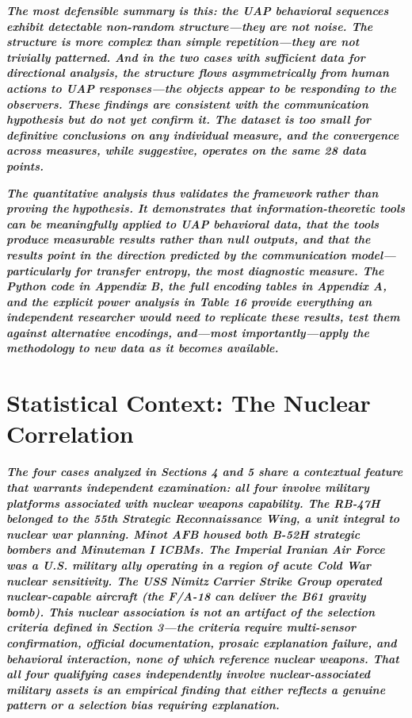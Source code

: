 \documentclass[11pt,letterpaper]{article}
\begin{document}
\textbf{\textit{The most defensible summary is this: the UAP behavioral sequences exhibit detectable non-random structure---they are not noise. The structure is more complex than simple repetition---they are not trivially patterned. And in the two cases with sufficient data for directional analysis, the structure flows asymmetrically from human actions to UAP responses---the objects appear to be responding to the observers. These findings are consistent with the communication hypothesis but do not yet confirm it. The dataset is too small for definitive conclusions on any individual measure, and the convergence across measures, while suggestive, operates on the same 28 data points.}}


\textbf{\textit{The quantitative analysis thus validates the }}\textbf{\textit{framework}}\textbf{\textit{ rather than proving the }}\textbf{\textit{hypothesis}}\textbf{\textit{. It demonstrates that information-theoretic tools can be meaningfully applied to UAP behavioral data, that the tools produce measurable results rather than null outputs, and that the results point in the direction predicted by the communication model---particularly for transfer entropy, the most diagnostic measure. The Python code in Appendix B, the full encoding tables in Appendix A, and the explicit power analysis in Table 16 provide everything an independent researcher would need to replicate these results, test them against alternative encodings, and---most importantly---apply the methodology to new data as it becomes available.}}


\section{Statistical Context: The Nuclear Correlation}

\textbf{\textit{The four cases analyzed in Sections 4 and 5 share a contextual feature that warrants independent examination: all four involve military platforms associated with nuclear weapons capability. The RB-47H belonged to the 55th Strategic Reconnaissance Wing, a unit integral to nuclear war planning. Minot AFB housed both B-52H strategic bombers and Minuteman I ICBMs. The Imperial Iranian Air Force was a U.S. military ally operating in a region of acute Cold War nuclear sensitivity. The USS }}\textbf{\textit{Nimitz}}\textbf{\textit{ Carrier Strike Group operated nuclear-capable aircraft (the F/A-18 can deliver the B61 gravity bomb). This nuclear association is not an artifact of the selection criteria defined in Section 3---the criteria require multi-sensor confirmation, official documentation, prosaic explanation failure, and behavioral interaction, none of which reference nuclear weapons. That all four qualifying cases independently involve nuclear-associated military assets is an empirical finding that either reflects a genuine pattern or a selection bias requiring explanation.}}
\end{document}
